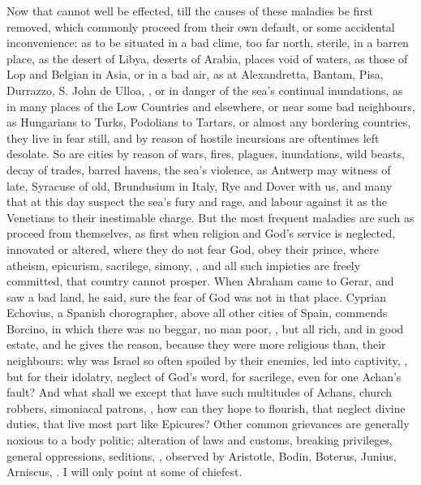 {Now that cannot well be effected, till the causes of these maladies be
first removed, which commonly proceed from their own default, or some
accidental inconvenience: as to be situated in a bad clime, too far
north, sterile, in a barren place, as the desert of Libya, deserts of
Arabia, places void of waters, as those of Lop and Belgian in Asia, or
in a bad air, as at Alexandretta, Bantam, Pisa, Durrazzo, S. John de
Ulloa, \etc{}, or in danger of the sea's continual inundations, as in many
places of the Low Countries and elsewhere, or near some bad neighbours,
as Hungarians to Turks, Podolians to Tartars, or almost any bordering
countries, they live in fear still, and by reason of hostile incursions
are oftentimes left desolate. So are cities by reason of wars,
fires, plagues, inundations, wild beasts, decay of trades, barred
havens, the sea's violence, as Antwerp may witness of late, Syracuse of
old, Brundusium in Italy, Rye and Dover with us, and many that at this
day suspect the sea's fury and rage, and labour against it as the
Venetians to their inestimable charge. But the most frequent maladies
are such as proceed from themselves, as first when religion and God's
service is neglected, innovated or altered, where they do not fear God,
obey their prince, where atheism, epicurism, sacrilege, simony, \etc{},
and all such impieties are freely committed, that country cannot
prosper. When Abraham came to Gerar, and saw a bad land, he said, sure
the fear of God was not in that place.  Cyprian Echovius, a
Spanish chorographer, above all other cities of Spain, commends
Borcino, in which there was no beggar, no man poor, \etc{}, but all rich,
and in good estate, and he gives the reason, because they were more
religious than, their neighbours: why was Israel so often spoiled by
their enemies, led into captivity, \etc{}, but for their idolatry, neglect
of God's word, for sacrilege, even for one Achan's fault? And what
shall we except that have such multitudes of Achans, church robbers,
simoniacal patrons, \etc{}, how can they hope to flourish, that neglect
divine duties, that live most part like Epicures?
Other common grievances are generally noxious to a body politic;
alteration of laws and customs, breaking privileges, general
oppressions, seditions, \etc{}, observed by Aristotle, Bodin,
Boterus, Junius, Arniscus, \etc{}. I will only point at some of chiefest.

}

